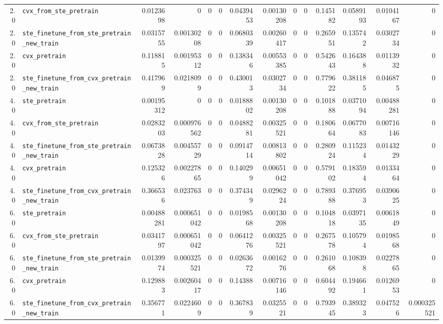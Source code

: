 \begin{longtable}{@{}r l *{12}{r}@{}}
2.0 & \texttt{cvx\_from\_ste\_pretrain} & 0.0123698 & 0 & 0 & 0 & 0.0439453 & 0.00130208 & 0 & 0 & 0.145182 & 0.0589193 & 0.0104167 & 0 \\
2.0 & \texttt{ste\_finetune\_from\_ste\_pretrain\_new\_train} & 0.0315755 & 0.00130208 & 0 & 0 & 0.0680339 & 0.00260417 & 0 & 0 & 0.265951 & 0.135742 & 0.0302734 & 0 \\
2.0 & \texttt{cvx\_pretrain} & 0.118815 & 0.00195312 & 0 & 0 & 0.138346 & 0.00553385 & 0 & 0 & 0.542643 & 0.164388 & 0.0113932 & 0 \\
2.0 & \texttt{ste\_finetune\_from\_cvx\_pretrain\_new\_train} & 0.417969 & 0.0218099 & 0 & 0 & 0.430013 & 0.0302734 & 0 & 0 & 0.779622 & 0.381185 & 0.046875 & 0 \\
4.0 & \texttt{ste\_pretrain} & 0.00195312 & 0 & 0 & 0 & 0.0188802 & 0.00130208 & 0 & 0 & 0.101888 & 0.0371094 & 0.00488281 & 0 \\
4.0 & \texttt{cvx\_from\_ste\_pretrain} & 0.0283203 & 0.000976562 & 0 & 0 & 0.0488281 & 0.00325521 & 0 & 0 & 0.180664 & 0.0677083 & 0.00716146 & 0 \\
4.0 & \texttt{ste\_finetune\_from\_ste\_pretrain\_new\_train} & 0.0673828 & 0.00455729 & 0 & 0 & 0.0914714 & 0.00813802 & 0 & 0 & 0.280924 & 0.115234 & 0.0143229 & 0 \\
4.0 & \texttt{cvx\_pretrain} & 0.125326 & 0.00227865 & 0 & 0 & 0.140299 & 0.00651042 & 0 & 0 & 0.579102 & 0.183594 & 0.0133464 & 0 \\
4.0 & \texttt{ste\_finetune\_from\_cvx\_pretrain\_new\_train} & 0.366536 & 0.023763 & 0 & 0 & 0.374349 & 0.0296224 & 0 & 0 & 0.789388 & 0.376953 & 0.0390625 & 0 \\
6.0 & \texttt{ste\_pretrain} & 0.00488281 & 0.000651042 & 0 & 0 & 0.0198568 & 0.00130208 & 0 & 0 & 0.104818 & 0.0397135 & 0.0061849 & 0 \\
6.0 & \texttt{cvx\_from\_ste\_pretrain} & 0.0341797 & 0.000651042 & 0 & 0 & 0.0641276 & 0.00325521 & 0 & 0 & 0.267578 & 0.105794 & 0.0198568 & 0 \\
6.0 & \texttt{ste\_finetune\_from\_ste\_pretrain\_new\_train} & 0.0139974 & 0.000325521 & 0 & 0 & 0.0263672 & 0.0016276 & 0 & 0 & 0.261068 & 0.108398 & 0.0227865 & 0 \\
6.0 & \texttt{cvx\_pretrain} & 0.129883 & 0.00260417 & 0 & 0 & 0.14388 & 0.00716146 & 0 & 0 & 0.604492 & 0.194661 & 0.0126953 & 0 \\
6.0 & \texttt{ste\_finetune\_from\_cvx\_pretrain\_new\_train} & 0.356771 & 0.0224609 & 0 & 0 & 0.367839 & 0.0325521 & 0 & 0 & 0.793945 & 0.389323 & 0.047526 & 0.000325521 \\

\end{longtable}
